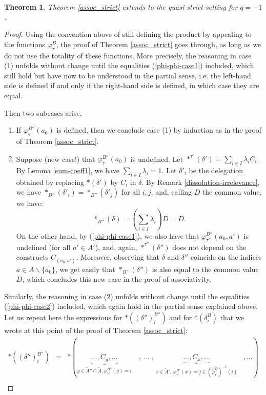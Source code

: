 \documentclass[11pt]{article}
\newtheorem{theorem}[theo]{Theorem}
\theoremstyle{definition}
\numberwithin{equation}{section}
\numberwithin{equation}{section}
\newcommand{\set}[1]{\{#1\}}
\newcommand{\plunderline}[1]{#1}
\begin{document}
\begin{theorem}\label{assoc_quasi_strict}
Theorem \ref{assoc_strict} extends to the quasi-strict setting for $q=-1$.
\end{theorem}
\begin{proof}
Using the convention above of still defining the   product by appealing to the functions $\varphi_\tau^B$,  the proof of Theorem \ref{assoc_strict} goes through, as long as we do not use the totality of these functions. More precisely, the reasoning in case (1) unfolds without change until the equalities (\ref{phi-phi-case1}) included, which still hold but have now to be understood in the partial sense, i.e. the left-hand side is defined if and only if the right-hand side is defined, in which case they are equal. 

Then two subcases arise.
\begin{enumerate}
\item[(1a)] If $\varphi_\tau^{B''}(a_0)$ is defined, then we conclude case (1) by induction as in the proof of Theorem  \ref{assoc_strict}.
\item[(1b)] Suppose   (new case!) that  $\varphi_\tau^{B''}(a_0)$ is undefined.    Let $\ast^{\tau'}(\delta')=\sum_{i\in I}\lambda_i C_i$.  By Lemma \ref{sum-coeff1}, we have 
$\sum_{i\in I}\lambda_i=1$. Let $\delta'_i$ be the delegation obtained by replacing $\ast(\delta')$ by $C_i$ in $\delta$. By Remark \ref{dissolution-irrelevance}, we have 
$\ast_{B''}(\delta'_i)=\ast_{B''}(\delta'_j)$ for all $i,j$, and, calling  $D$  the common value, we have:
$$\ast_{B''}(\delta)= (\sum_{i\in I}\lambda_i) D = D.$$
On the other hand, by (\ref{phi-phi-case1}), we also have that 
$\varphi_{\tau''}^{B''}(a_0,a')$ is undefined (for all $a'\in A'$), and, again, $\ast^{\tau''}(\delta'')$ does not depend on the  constructs $C_{(a_0,a')}$.  
Moreover, observing that $\delta$ and $\delta''$  coincide on the indices $a\in A\backslash\set{a_0}$,  we get easily that
$\ast_{B''}(\delta'')$ is also equal to the common value $D$, which concludes this new case in the proof of associativity.
\end{enumerate}
Similarly, the reasoning in case (2) unfolds without change until the equalities (\ref{phi-phi-case2}) included, which again hold in the partial sense explained above. Let us repeat here the expressions for $ \ast((\delta'')^{B''}_{i})$ and  for $\ast(\delta_i^{\plunderline{B}})$ that we wrote at this point of the proof of Theorem \ref{assoc_strict}:
 $$\begin{array}{lll}
 \ast((\delta'')^{B''}_{i}) & = &  \ast(\underbrace{\ldots, C_y, \ldots}_{y\in \tilde{A}''\cap \tilde{A},\varphi_{\tau''}^{B''}(y)=i}\,\,\,\,\,\,,\:\ldots\:,\,\underbrace{\ldots, C_x, \ldots}_{x\in \tilde{A}',\, \varphi^{\plunderline{B'}}_{\tau'}(x)=j\in (\tilde{\varphi}_{\tau}^{\plunderline{B}})^{-1}(i)}  \,\,\,\;,\ldots)\\

\end{array}$$
\end{proof}
\end{document}
